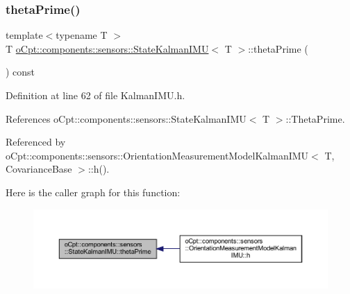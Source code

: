 \subsubsection{\texorpdfstring{theta\+Prime()}{thetaPrime()}\hspace{0.1cm}{\footnotesize\ttfamily [1/2]}}
{\footnotesize\ttfamily template$<$typename T $>$ \\
T \hyperlink{classo_cpt_1_1components_1_1sensors_1_1_state_kalman_i_m_u}{o\+Cpt\+::components\+::sensors\+::\+State\+Kalman\+I\+MU}$<$ T $>$\+::theta\+Prime (\begin{DoxyParamCaption}{ }\end{DoxyParamCaption}) const\hspace{0.3cm}{\ttfamily [inline]}}



Definition at line 62 of file Kalman\+I\+M\+U.\+h.



References o\+Cpt\+::components\+::sensors\+::\+State\+Kalman\+I\+M\+U$<$ T $>$\+::\+Theta\+Prime.



Referenced by o\+Cpt\+::components\+::sensors\+::\+Orientation\+Measurement\+Model\+Kalman\+I\+M\+U$<$ T, Covariance\+Base $>$\+::h().

Here is the caller graph for this function\+:
\nopagebreak
\begin{figure}[H]
\begin{center}
\leavevmode
\includegraphics[width=350pt]{classo_cpt_1_1components_1_1sensors_1_1_state_kalman_i_m_u_a76f4d4c223a3544dc4212caf7ea8abc0_icgraph}
\end{center}
\end{figure}
\hypertarget{classo_cpt_1_1components_1_1sensors_1_1_state_kalman_i_m_u_a4e86d8dbc6526e34a98507e38a47942d}{}\label{classo_cpt_1_1components_1_1sensors_1_1_state_kalman_i_m_u_a4e86d8dbc6526e34a98507e38a47942d} 
